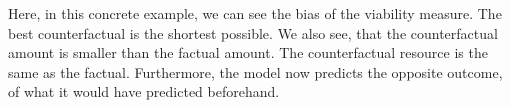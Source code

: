 \documentclass[./../../paper.tex]{subfiles}
\begin{document}





Here, in this concrete example, we can see the bias of the viability measure. The best counterfactual is the shortest possible. We also see, that the counterfactual amount is smaller than the factual amount. The counterfactual resource is the same as the factual. Furthermore, the model now predicts the opposite outcome, of what it would have predicted beforehand.
\end{document}
